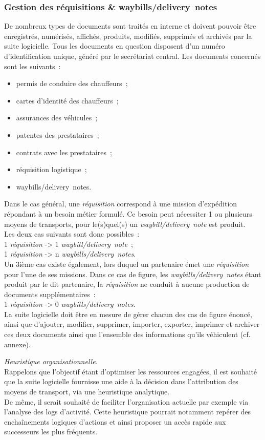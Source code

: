 \subsubsection{Gestion des réquisitions \& waybills/delivery~notes}
De nombreux types de documents sont traités en interne et doivent pouvoir être enregistrés, numérisés, affichés, produits, modifiés, supprimés et archivés par la suite logicielle.
Tous les documents en question disposent d'un numéro d'identification unique, généré par le secrétariat central.
Les documents concernés sont les suivants~:
\begin{itemize}
	\item permis de conduire des chauffeurs~;
	\item cartes d'identité des chauffeurs~;
	\item assurances des véhicules~;
	\item patentes des prestataires~;
	\item contrats avec les prestataires~;
	\item réquisition logistique~;
	\item waybills/delivery~notes.
\end{itemize}
Dans le cas général, une \emph{réquisition} correspond à une mission d'expédition répondant à un besoin métier formulé.
Ce besoin peut nécessiter 1 ou plusieurs moyens de transports, pour le(s)quel(s) un \emph{waybill/delivery~note} est produit.
\\
Les deux cas suivants sont donc possibles~:
\\
1 \emph{réquisition} -> 1 \emph{waybill/delivery~note}~;
\\
1 \emph{réquisition} -> n \emph{waybills/delivery~notes}.
\\
Un 3ième cas existe également, lors duquel un partenaire émet une \emph{réquisition} pour l'une de ses missions.
Dans ce cas de figure, les \emph{waybills/delivery~notes} étant produit par le dit partenaire, la \emph{réquisition} ne conduit à aucune production de documents supplémentaires~:
\\
1 \emph{réquisition} -> 0 \emph{waybills/delivery~notes}.
\\
La suite logicielle doit être en mesure de gérer chacun des cas de figure énoncé, ainsi que d'ajouter, modifier, supprimer, importer, exporter, imprimer et archiver ces deux documents ainsi que l'ensemble des informations qu'ils véhiculent (cf. annexe).
\begin{notation}
	\emph{Heuristique organisationnelle.}
	\\
	Rappelons que l'objectif étant d'optimiser les ressources engagées, il est souhaité que la suite logicielle fournisse une aide à la décision dans l'attribution des moyens de transport, via une heuristique analytique.
	\\
	De même, il serait souhaité de faciliter l'organisation actuelle par exemple via l'analyse des logs d'activité.
	Cette heuristique pourrait notamment repérer des enchaînements logiques d'actions et ainsi proposer un accès rapide aux successeurs les plus fréquents.
\end{notation}


